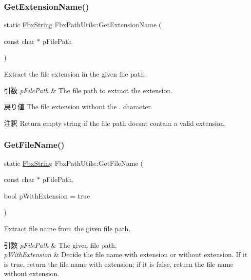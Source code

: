 \subsubsection{\texorpdfstring{Get\+Extension\+Name()}{GetExtensionName()}}
{\footnotesize\ttfamily static \hyperlink{class_fbx_string}{Fbx\+String} Fbx\+Path\+Utils\+::\+Get\+Extension\+Name (\begin{DoxyParamCaption}\item[{const char $\ast$}]{p\+File\+Path }\end{DoxyParamCaption})\hspace{0.3cm}{\ttfamily [static]}}

Extract the file extension in the given file path. 
\begin{DoxyParams}{引数}
{\em p\+File\+Path} & The file path to extract the extension. \\
\hline
\end{DoxyParams}
\begin{DoxyReturn}{戻り値}
The file extension without the \textquotesingle{}.\textquotesingle{} character. 
\end{DoxyReturn}
\begin{DoxyRemark}{注釈}
Return empty string if the file path doesn\textquotesingle{}t contain a valid extension. 
\end{DoxyRemark}
\mbox{\label{class_fbx_path_utils_ac7822ad3605dcfbe63e99a848e959d50}} 
\subsubsection{\texorpdfstring{Get\+File\+Name()}{GetFileName()}}
{\footnotesize\ttfamily static \hyperlink{class_fbx_string}{Fbx\+String} Fbx\+Path\+Utils\+::\+Get\+File\+Name (\begin{DoxyParamCaption}\item[{const char $\ast$}]{p\+File\+Path,  }\item[{bool}]{p\+With\+Extension = {\ttfamily true} }\end{DoxyParamCaption})\hspace{0.3cm}{\ttfamily [static]}}

Extract file name from the given file path. 
\begin{DoxyParams}{引数}
{\em p\+File\+Path} & The given file path. \\
\hline
{\em p\+With\+Extension} & Decide the file name with extension or without extension. If it is true, return the file name with extension; if it is false, return the file name without extension. \\
\hline
\end{DoxyParams}
\mbox{\label{class_fbx_path_utils_a387c0512f521b504303361b2d79c4242}} 
